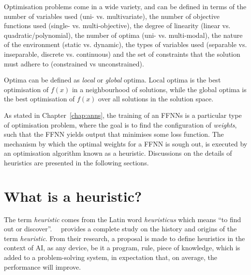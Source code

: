 \noindent
Optimisation problems come in a wide variety, and can be defined in terms of the number of variables used (uni- vs. multivariate), the number of objective functions used (single- vs. multi-objective), the degree of linearity (linear vs. quadratic/polynomial), the number of optima (uni- vs. multi-modal), the nature of the environment (static vs. dynamic), the types of variables used (separable vs. inseparable, discrete vs. continuous) and the set of constraints that the solution must adhere to (constrained vs unconstrained).

Optima can be defined as \textit{local} or \textit{global} optima. Local optima is the best optimisation of $f(x)$ in a neighbourhood of solutions, while the global optima is the best optimisation of $f(x)$ over all solutions in the solution space.

As stated in Chapter~\ref{chap:anns}, the training of an \acp{FFNN} is a particular type of optimisation problem, where the goal is to find the configuration of \textit{weights}, such that the \acs{FFNN} yields output that minimises some loss function. The mechanism by which the optimal weights for a \acs{FFNN} is sough out, is executed by an optimisation algorithm known as a heuristic. Discussions on the details of heuristics are presented in the following sections.

\section{What is a heuristic?}\label{sec:heuristics:what_is_a_heuristic}

The term \textit{heuristic} comes from the Latin word \textit{heuristicus} which means ``to find out or discover''.~\citeauthor{ref:romanycia:1985}~\cite{ref:romanycia:1985} provides a complete study on the history and origins of the term \textit{heuristic}. From their research, a proposal is made to define heuristics in the context of \acf{AI}, as any device, be it a program, rule, piece of knowledge, which is added to a problem-solving system, in expectation that, on average, the performance will improve.


